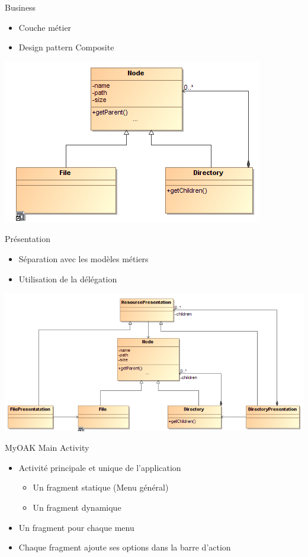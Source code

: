 \begin{frame}{Business}
	\begin{itemize}
		\item Couche métier
		\item Design pattern Composite
	\end{itemize}
	\hspace{3cm} \includegraphics[scale=0.6]{img/designComposite}
\end{frame}		
		
\begin{frame}{Présentation}
	\begin{itemize}
		\item Séparation avec les modèles métiers
		\item Utilisation de la délégation
	\end{itemize}
	\includegraphics[scale=0.5]{img/presentation}
\end{frame}	

\begin{frame}{MyOAK Main Activity}
	\begin{itemize}
		\item Activité principale et unique de l’application
			\begin{itemize}
			\item Un fragment statique (Menu général)
			\item Un fragment dynamique
			\end{itemize}
		\item Un fragment pour chaque menu
		\item Chaque fragment ajoute ses options dans la barre d’action
	\end{itemize}
\end{frame}	

